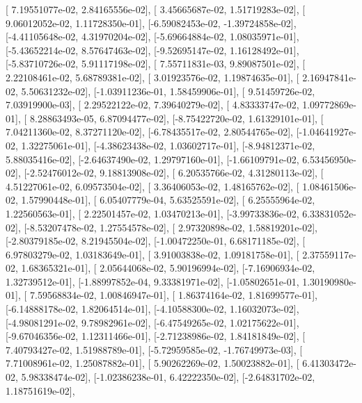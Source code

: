 \documentclass{article}
\begin{document}
       [ 7.19551077e-02,  2.84165556e-02],
       [ 3.45665687e-02,  1.51719283e-02],
       [ 9.06012052e-02,  1.11728350e-01],
       [-6.59082453e-02, -1.39724858e-02],
       [-4.41105648e-02,  4.31970204e-02],
       [-5.69664884e-02,  1.08035971e-01],
       [-5.43652214e-02,  8.57647463e-02],
       [-9.52695147e-02,  1.16128492e-01],
       [-5.83710726e-02,  5.91117198e-02],
       [ 7.55711831e-03,  9.89087501e-02],
       [ 2.22108461e-02,  5.68789381e-02],
       [ 3.01923576e-02,  1.19874635e-01],
       [ 2.16947841e-02,  5.50631232e-02],
       [-1.03911236e-01,  1.58459906e-01],
       [ 9.51459726e-02,  7.03919900e-03],
       [ 2.29522122e-02,  7.39640279e-02],
       [ 4.83333747e-02,  1.09772869e-01],
       [ 8.28863493e-05,  6.87094477e-02],
       [-8.75422720e-02,  1.61329101e-01],
       [ 7.04211360e-02,  8.37271120e-02],
       [-6.78435517e-02,  2.80544765e-02],
       [-1.04641927e-02,  1.32275061e-01],
       [-4.38623438e-02,  1.03602717e-01],
       [-8.94812371e-02,  5.88035416e-02],
       [-2.64637490e-02,  1.29797160e-01],
       [-1.66109791e-02,  6.53456950e-02],
       [-2.52476012e-02,  9.18813908e-02],
       [ 6.20535766e-02,  4.31280113e-02],
       [ 4.51227061e-02,  6.09573504e-02],
       [ 3.36406053e-02,  1.48165762e-02],
       [ 1.08461506e-02,  1.57990448e-01],
       [ 6.05407779e-04,  5.63525591e-02],
       [ 6.25555964e-02,  1.22560563e-01],
       [ 2.22501457e-02,  1.03470213e-01],
       [-3.99733836e-02,  6.33831052e-02],
       [-8.53207478e-02,  1.27554578e-02],
       [ 2.97320898e-02,  1.58819201e-02],
       [-2.80379185e-02,  8.21945504e-02],
       [-1.00472250e-01,  6.68171185e-02],
       [ 6.97803279e-02,  1.03183649e-01],
       [ 3.91003838e-02,  1.09181758e-01],
       [ 2.37559117e-02,  1.68365321e-01],
       [ 2.05644068e-02,  5.90196994e-02],
       [-7.16906934e-02,  1.32739512e-01],
       [-1.88997852e-04,  9.33381971e-02],
       [-1.05802651e-01,  1.30190980e-01],
       [ 7.59568834e-02,  1.00846947e-01],
       [ 1.86374164e-02,  1.81699577e-01],
       [-6.14888178e-02,  1.82064514e-01],
       [-4.10588300e-02,  1.16032073e-02],
       [-4.98081291e-02,  9.78982961e-02],
       [-6.47549265e-02,  1.02175622e-01],
       [-9.67046356e-02,  1.12311466e-01],
       [-2.71238986e-02,  1.84181849e-02],
       [ 7.40793427e-02,  1.51988789e-01],
       [-5.72959585e-02, -1.76749973e-03],
       [ 7.71008961e-02,  1.25087882e-01],
       [ 5.90262269e-02,  1.50023882e-01],
       [ 6.41303472e-02,  5.98338474e-02],
       [-1.02386238e-01,  6.42222350e-02],
       [-2.64831702e-02,  1.18751619e-02],
\end{document}
